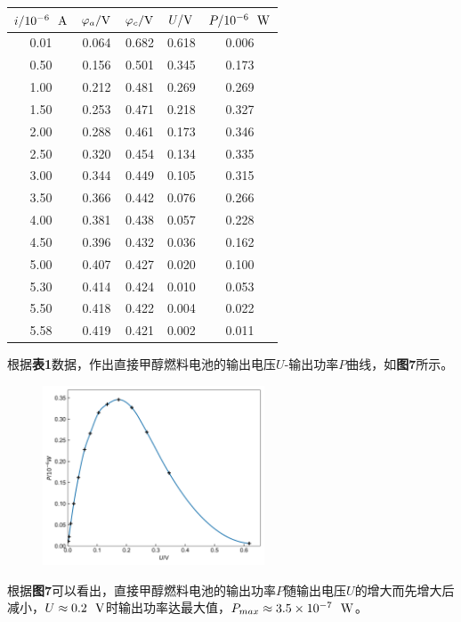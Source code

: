 \documentclass[12pt]{article}
\begin{document}
\begin{table}[h]
	\centering
	\begin{tabular}{ccccc}
		\toprule
		$i/{\rm 10^{-6}\ \ A}$ & $\varphi_{a}/{\rm V}$ & $\varphi_{c}/{\rm V}$ & $U/{\rm V}$ & $P/{\rm 10^{-6}\ \ W}$ \\
		\midrule
	0.01 & 0.064 & 0.682 & 0.618 & 0.006 \\
	0.50 & 0.156 & 0.501 & 0.345 & 0.173 \\
	1.00 & 0.212 & 0.481 & 0.269 & 0.269 \\
	1.50 & 0.253 & 0.471 & 0.218 & 0.327 \\
	2.00 & 0.288 & 0.461 & 0.173 & 0.346 \\
	2.50 & 0.320 & 0.454 & 0.134 & 0.335 \\
	3.00 & 0.344 & 0.449 & 0.105 & 0.315 \\
	3.50 & 0.366 & 0.442 & 0.076 & 0.266 \\
	4.00 & 0.381 & 0.438 & 0.057 & 0.228 \\
	4.50 & 0.396 & 0.432 & 0.036 & 0.162 \\
	5.00 & 0.407 & 0.427 & 0.020 & 0.100 \\
	5.30 & 0.414 & 0.424 & 0.010 & 0.053 \\
	5.50 & 0.418 & 0.422 & 0.004 & 0.022 \\
	5.58 & 0.419 & 0.421 & 0.002 & 0.011\\
		\bottomrule
	\end{tabular}
\end{table}
\par
根据\textbf{表1}数据，作出直接甲醇燃料电池的输出电压$U$-输出功率$P$曲线，如\textbf{图7}所示。
\begin{figure}[h]
	\centering
	\includegraphics[width=0.587\textwidth]{7.jpg}
\end{figure}
\par
根据\textbf{图7}可以看出，直接甲醇燃料电池的输出功率$P$随输出电压$U$的增大而先增大后减小，$U\approx0.2\ \ {\rm V}$时输出功率达最大值，$P_{max}\approx 3.5\times10^{-7}\ \ {\rm W}$。
\end{document}
